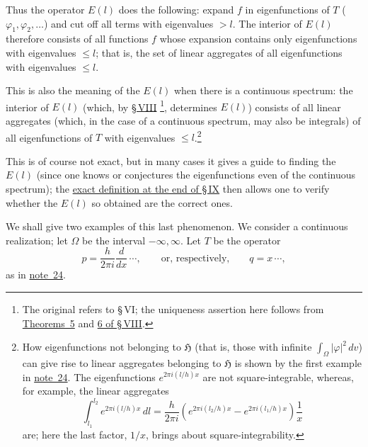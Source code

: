 \documentclass[fontsize=13pt,paper=b5,twoside,bookmarkpackage=false]{scrartcl}
\newcommand{\Sec}[1]{\hyperref[sec:#1]{\S\,#1}}
\newcommand{\fnref}[1]{\hyperref[fn:#1]{note~#1}}
\newcounter{translatornote}
\newcommand{\tnote}[1]{%
  \begingroup\stepcounter{translatornote}%
  \renewcommand{\thefootnote}{T\arabic{translatornote}}%
  \footnote[0]{#1}\endgroup}
\begin{document}
Thus the operator $E(l)$ does the following: expand $f$ in eigenfunctions of $T$ ($\varphi_1,\varphi_2,\ldots$) and cut off all terms with eigenvalues $>l$. The interior of $E(l)$ therefore consists of all functions $f$ whose expansion contains only eigenfunctions with eigenvalues $\leq l$; that is, the set of linear aggregates of all eigenfunctions with eigenvalues $\leq l$.

This is also the meaning of the $E(l)$ when there is a continuous spectrum: the interior of $E(l)$ (which, by \Sec{VIII}\tnote{The original refers to \S\,VI; the uniqueness assertion here follows from \hyperref[thm:VIII:5]{Theorems~5} and \hyperref[thm:VIII:6]{6 of \S\,VIII}.}, determines $E(l)$) consists of all linear aggregates (which, in the case of a continuous spectrum, may also be integrals) of all eigenfunctions of $T$ with eigenvalues $\leq l$.\footnote[28]{\label{fn:28}How eigenfunctions not belonging to $\mathfrak{H}$ (that is, those with infinite $\int_\Omega|\varphi|^2\,dv$) can give rise to linear aggregates belonging to $\mathfrak{H}$ is shown by the first example in \fnref{24}. The eigenfunctions $e^{2\pi i(l/h)x}$ are not square-integrable, whereas, for example, the linear aggregates
\[
 \int_{l_1}^{l_2}e^{2\pi i(l/h)x}\,dl
 =\frac{h}{2\pi i}\left(e^{2\pi i(l_2/h)x}-e^{2\pi i(l_1/h)x}\right)\frac1x
\]
are; here the last factor, $1/x$, brings about square-integrability.}

This is of course not exact, but in many cases it gives a guide to finding the $E(l)$ (since one knows or conjectures the eigenfunctions even of the continuous spectrum); the \hyperref[cond:IX:1]{exact definition at the end of \S\,IX} then allows one to verify whether the $E(l)$ so obtained are the correct ones.

We shall give two examples of this last phenomenon. We consider a continuous realization; let $\Omega$ be the interval $-\infty,\infty$. Let $T$ be the operator
\[
 p=\frac{h}{2\pi i}\frac{d}{dx}\,\cdots,
 \qquad\text{or, respectively,}\qquad q=x\,\cdots,
\]
as in \fnref{24}.
\end{document}
